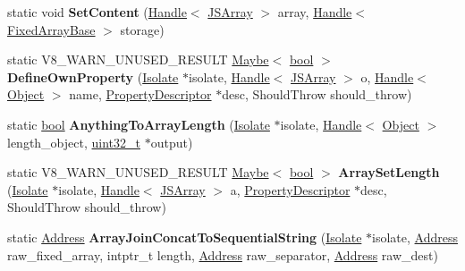 \begin{DoxyCompactItemize}
static void {\bfseries Set\+Content} (\mbox{\hyperlink{classv8_1_1internal_1_1Handle}{Handle}}$<$ \mbox{\hyperlink{classv8_1_1internal_1_1JSArray}{J\+S\+Array}} $>$ array, \mbox{\hyperlink{classv8_1_1internal_1_1Handle}{Handle}}$<$ \mbox{\hyperlink{classv8_1_1internal_1_1FixedArrayBase}{Fixed\+Array\+Base}} $>$ storage)
\item 
\mbox{\label{classv8_1_1internal_1_1JSArray_a6bcefd1ec362326a85e9e5e072883d27}} 
static V8\+\_\+\+W\+A\+R\+N\+\_\+\+U\+N\+U\+S\+E\+D\+\_\+\+R\+E\+S\+U\+LT \mbox{\hyperlink{classv8_1_1Maybe}{Maybe}}$<$ \mbox{\hyperlink{classbool}{bool}} $>$ {\bfseries Define\+Own\+Property} (\mbox{\hyperlink{classv8_1_1internal_1_1Isolate}{Isolate}} $\ast$isolate, \mbox{\hyperlink{classv8_1_1internal_1_1Handle}{Handle}}$<$ \mbox{\hyperlink{classv8_1_1internal_1_1JSArray}{J\+S\+Array}} $>$ o, \mbox{\hyperlink{classv8_1_1internal_1_1Handle}{Handle}}$<$ \mbox{\hyperlink{classv8_1_1internal_1_1Object}{Object}} $>$ name, \mbox{\hyperlink{classv8_1_1internal_1_1PropertyDescriptor}{Property\+Descriptor}} $\ast$desc, Should\+Throw should\+\_\+throw)
\item 
\mbox{\label{classv8_1_1internal_1_1JSArray_ab1c733216a8e34bb2a814162dabd8008}} 
static \mbox{\hyperlink{classbool}{bool}} {\bfseries Anything\+To\+Array\+Length} (\mbox{\hyperlink{classv8_1_1internal_1_1Isolate}{Isolate}} $\ast$isolate, \mbox{\hyperlink{classv8_1_1internal_1_1Handle}{Handle}}$<$ \mbox{\hyperlink{classv8_1_1internal_1_1Object}{Object}} $>$ length\+\_\+object, \mbox{\hyperlink{classuint32__t}{uint32\+\_\+t}} $\ast$output)
\item 
\mbox{\label{classv8_1_1internal_1_1JSArray_a1a85c4694c5c524713cf52d58d577049}} 
static V8\+\_\+\+W\+A\+R\+N\+\_\+\+U\+N\+U\+S\+E\+D\+\_\+\+R\+E\+S\+U\+LT \mbox{\hyperlink{classv8_1_1Maybe}{Maybe}}$<$ \mbox{\hyperlink{classbool}{bool}} $>$ {\bfseries Array\+Set\+Length} (\mbox{\hyperlink{classv8_1_1internal_1_1Isolate}{Isolate}} $\ast$isolate, \mbox{\hyperlink{classv8_1_1internal_1_1Handle}{Handle}}$<$ \mbox{\hyperlink{classv8_1_1internal_1_1JSArray}{J\+S\+Array}} $>$ a, \mbox{\hyperlink{classv8_1_1internal_1_1PropertyDescriptor}{Property\+Descriptor}} $\ast$desc, Should\+Throw should\+\_\+throw)
\item 
\mbox{\label{classv8_1_1internal_1_1JSArray_a82c37c3175af643a6c104f1173782435}} 
static \mbox{\hyperlink{classuintptr__t}{Address}} {\bfseries Array\+Join\+Concat\+To\+Sequential\+String} (\mbox{\hyperlink{classv8_1_1internal_1_1Isolate}{Isolate}} $\ast$isolate, \mbox{\hyperlink{classuintptr__t}{Address}} raw\+\_\+fixed\+\_\+array, intptr\+\_\+t length, \mbox{\hyperlink{classuintptr__t}{Address}} raw\+\_\+separator, \mbox{\hyperlink{classuintptr__t}{Address}} raw\+\_\+dest)
\end{DoxyCompactItemize}

